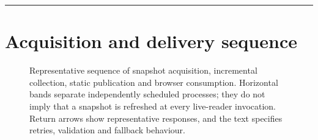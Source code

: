 \documentclass[10pt,a4paper]{article}
\begin{document}
\clearpage
\begin{landscape}
\thispagestyle{empty}
\vspace{0.4em}\hrule\vspace{0.8em}
\section{Acquisition and delivery sequence}
\begin{figure}[htbp]
\centering

\caption{Representative sequence of snapshot acquisition, incremental collection, static publication and browser consumption. Horizontal bands separate independently scheduled processes; they do not imply that a snapshot is refreshed at every live-reader invocation. Return arrows show representative responses, and the text specifies retries, validation and fallback behaviour.}
\label{fig:sequence}
\end{figure}
\vfill
\begin{center}\small\thepage\end{center}
\end{landscape}
\end{document}

